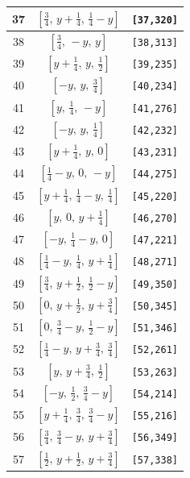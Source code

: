 \documentclass[fleqn,8pt]{jsarticle}
\begin{document}
\begin{longtable}{ccc}
37 & $\left[ \frac{3}{4},\, y + \frac{1}{4},\, \frac{1}{4} - y \right]$ & {\tt [37,320]} \\ \hline
38 & $\left[ \frac{3}{4},\, - y,\, y \right]$ & {\tt [38,313]} \\ \hline
39 & $\left[ y + \frac{1}{4},\, y,\, \frac{1}{2} \right]$ & {\tt [39,235]} \\ \hline
40 & $\left[ - y,\, y,\, \frac{3}{4} \right]$ & {\tt [40,234]} \\ \hline
41 & $\left[ y,\, \frac{1}{4},\, - y \right]$ & {\tt [41,276]} \\ \hline
42 & $\left[ - y,\, y,\, \frac{1}{4} \right]$ & {\tt [42,232]} \\ \hline
43 & $\left[ y + \frac{1}{4},\, y,\, 0 \right]$ & {\tt [43,231]} \\ \hline
44 & $\left[ \frac{1}{4} - y,\, 0,\, - y \right]$ & {\tt [44,275]} \\ \hline
45 & $\left[ y + \frac{1}{4},\, \frac{1}{4} - y,\, \frac{1}{4} \right]$ & {\tt [45,220]} \\ \hline
46 & $\left[ y,\, 0,\, y + \frac{1}{4} \right]$ & {\tt [46,270]} \\ \hline
47 & $\left[ - y,\, \frac{1}{4} - y,\, 0 \right]$ & {\tt [47,221]} \\ \hline
48 & $\left[ \frac{1}{4} - y,\, \frac{1}{4},\, y + \frac{1}{4} \right]$ & {\tt [48,271]} \\ \hline
49 & $\left[ \frac{3}{4},\, y + \frac{1}{2},\, \frac{1}{2} - y \right]$ & {\tt [49,350]} \\ \hline
50 & $\left[ 0,\, y + \frac{1}{2},\, y + \frac{3}{4} \right]$ & {\tt [50,345]} \\ \hline
51 & $\left[ 0,\, \frac{3}{4} - y,\, \frac{1}{2} - y \right]$ & {\tt [51,346]} \\ \hline
52 & $\left[ \frac{1}{4} - y,\, y + \frac{3}{4},\, \frac{3}{4} \right]$ & {\tt [52,261]} \\ \hline
53 & $\left[ y,\, y + \frac{3}{4},\, \frac{1}{2} \right]$ & {\tt [53,263]} \\ \hline
54 & $\left[ - y,\, \frac{1}{2},\, \frac{3}{4} - y \right]$ & {\tt [54,214]} \\ \hline
55 & $\left[ y + \frac{1}{4},\, \frac{3}{4},\, \frac{3}{4} - y \right]$ & {\tt [55,216]} \\ \hline
56 & $\left[ \frac{3}{4},\, \frac{3}{4} - y,\, y + \frac{3}{4} \right]$ & {\tt [56,349]} \\ \hline
57 & $\left[ \frac{1}{2},\, y + \frac{1}{2},\, y + \frac{3}{4} \right]$ & {\tt [57,338]} \\ \hline

\end{longtable}
\end{document}
